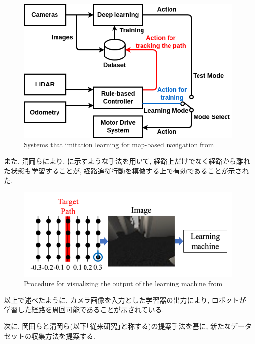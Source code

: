 \begin{figure}[h]
     \centering
     \includegraphics[keepaspectratio, scale=0.42]
     {images/okada-si2020.png}
     \caption{Systems that imitation learning for map-based navigation from \cite{okada-si2020}}
     \label{Fig:okada-si2020}
     \end{figure}

\newpage
また, 清岡ら\cite{kiyooka-si}により, に示すような手法を用いて, 経路上だけでなく経路から離れた状態も学習することが, 経路追従行動を模倣する上で有効であることが示された. 

\vspace{10mm}

\begin{figure}[h]
     \centering
     \includegraphics[keepaspectratio, scale=0.45]{images/kiyooka-si-1.png}
     \caption{Procedure for visualizing the output of the learning machine from \cite{kiyooka-si}}
     \label{Fig:kiyooka-si}
     \end{figure}

\vspace{20mm}
以上で述べたように, カメラ画像を入力とした学習器の出力により, ロボットが学習した経路を周回可能であることが示されている. \par 次に, 岡田らと清岡ら(以下｢従来研究｣と称する)の提案手法を基に, 新たなデータセットの収集方法を提案する.


